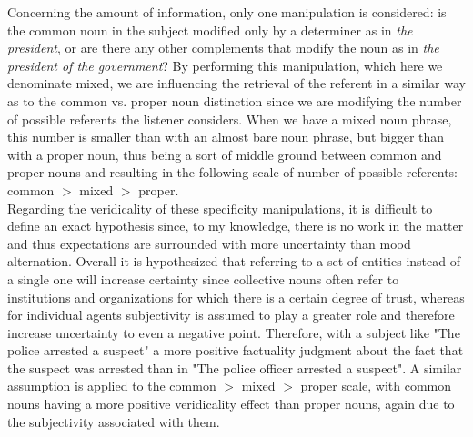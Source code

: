 Concerning the amount of information, only one manipulation is considered: is the common noun in the subject modified only by a determiner as in \textit{the president}, or are there any other complements that modify the noun as in \textit{the president of the government}? By performing this manipulation, which here we denominate mixed, we are influencing the retrieval of the referent in a similar way as to the common vs. proper noun distinction since we are modifying the number of possible referents the listener considers. When we have a mixed noun phrase, this number is smaller than with an almost bare noun phrase, but bigger than with a proper noun, thus being a sort of middle ground between common and proper nouns and resulting in the following scale of number of possible referents: common $>$ mixed $>$ proper.\\ 

Regarding the veridicality of these specificity manipulations, it is difficult to define an exact hypothesis since, to my knowledge, there is no work in the matter and thus expectations are surrounded with more uncertainty than mood alternation. Overall it is hypothesized that referring to a set of entities instead of a single one will increase certainty since collective nouns often refer to institutions and organizations for which there is a certain degree of trust, whereas for individual agents subjectivity is assumed to play a greater role and therefore increase uncertainty to even a negative point. Therefore, with a subject like "The police arrested a suspect" a more positive factuality judgment about the fact that the suspect was arrested than in "The police officer arrested a suspect". A similar assumption is applied to the common $>$ mixed $>$ proper scale, with common nouns having a more positive veridicality effect than proper nouns, again due to the subjectivity associated with them.\\